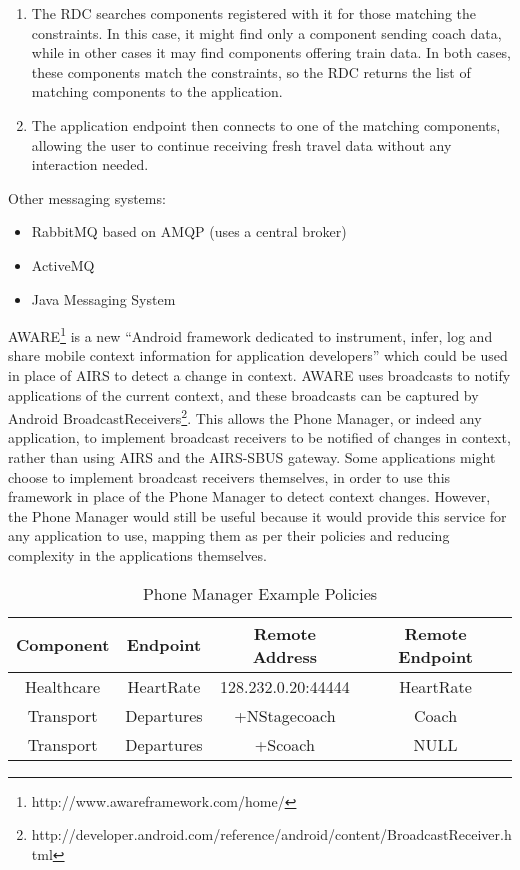 \documentclass[12pt,twoside,notitlepage]{report}
\begin{document}
\begin{enumerate}
\item The RDC searches components registered with it for those matching the constraints. In this case, it might find only a component sending coach data, while in other cases it may find components offering train data. In both cases, these components match the constraints, so the RDC returns the list of matching components to the application.

\item The application endpoint then connects to one of the matching components, allowing the user to continue receiving fresh travel data without any interaction needed.

\end{enumerate}

Other messaging systems:
\begin{itemize}

\item RabbitMQ based on AMQP (uses a central broker)
\item ActiveMQ
\item Java Messaging System
\end{itemize}

AWARE\footnote{http://www.awareframework.com/home/} is a new ``Android framework dedicated to instrument, infer, log and share mobile context information for application developers'' which could be used in place of AIRS to detect a change in context.
AWARE uses broadcasts to notify applications of the current context, and these broadcasts can be captured by Android BroadcastReceivers\footnote{http://developer.android.com/reference/android/content/BroadcastReceiver.html}. This allows the Phone Manager, or indeed any application, to implement broadcast receivers to be notified of changes in context, rather than using AIRS and the AIRS-SBUS gateway. 
Some applications might choose to implement broadcast receivers themselves, in order to use this framework in place of the Phone Manager to detect context changes.
However, the Phone Manager would still be useful because it would provide this service for any application to use, mapping them as per their policies and reducing complexity in the applications themselves.

\begin{table}[tbh]
\centering

\begin{tabular}{c c c c}
\hline\hline
Component & Endpoint & Remote Address & Remote Endpoint \\
\hline

Healthcare & HeartRate & 128.232.0.20:44444 & HeartRate \\
Transport & Departures & +NStagecoach & Coach \\
Transport & Departures & +Scoach & NULL \\

\hline
\end{tabular}

\caption{Phone Manager Example Policies}
\label{tab:example_policies}
\end{table}
\end{document}
